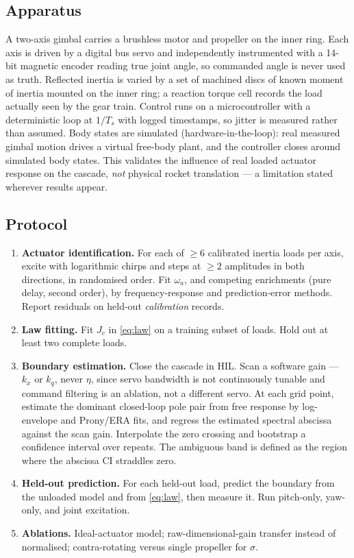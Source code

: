 \documentclass[11pt,a4paper]{article}
\begin{document}
\subsection{Apparatus}

A two-axis gimbal carries a brushless motor and propeller on the inner ring. Each axis is driven by a
digital bus servo and independently instrumented with a 14-bit magnetic encoder reading true joint
angle, so commanded angle is never used as truth. Reflected inertia is varied by a set of machined
discs of known moment of inertia mounted on the inner ring; a reaction torque cell records the load
actually seen by the gear train. Control runs on a microcontroller with a deterministic loop at
$1/T_s$ with logged timestamps, so jitter is measured rather than assumed. Body states are simulated
(hardware-in-the-loop): real measured gimbal motion drives a virtual free-body plant, and the
controller closes around simulated body states. This validates the influence of real loaded actuator
response on the cascade, \emph{not} physical rocket translation --- a limitation stated wherever
results appear.

\subsection{Protocol}

\begin{enumerate}
\item \textbf{Actuator identification.} For each of $\geq 6$ calibrated inertia loads per axis, excite
with logarithmic chirps and steps at $\geq 2$ amplitudes in both directions, in randomised order.
Fit $\omega_a$, and competing enrichments (pure delay, second order), by frequency-response and
prediction-error methods. Report residuals on held-out \emph{calibration} records.
\item \textbf{Law fitting.} Fit $J_c$ in \eqref{eq:law} on a training subset of loads. Hold out at
least two complete loads.
\item \textbf{Boundary estimation.} Close the cascade in HIL. Scan a software gain --- $k_x$ or $k_q$,
never $\eta$, since servo bandwidth is not continuously tunable and command filtering is an ablation,
not a different servo. At each grid point, estimate the dominant closed-loop pole pair from free
response by log-envelope and Prony/ERA fits, and regress the estimated spectral abscissa against the
scan gain. Interpolate the zero crossing and bootstrap a confidence interval over repeats. The
ambiguous band is defined as the region where the abscissa CI straddles zero.
\item \textbf{Held-out prediction.} For each held-out load, predict the boundary from the unloaded
model and from \eqref{eq:law}, then measure it. Run pitch-only, yaw-only, and joint excitation.
\item \textbf{Ablations.} Ideal-actuator model; raw-dimensional-gain transfer instead of normalised;
contra-rotating versus single propeller for $\sigma$.
\end{enumerate}
\end{document}
